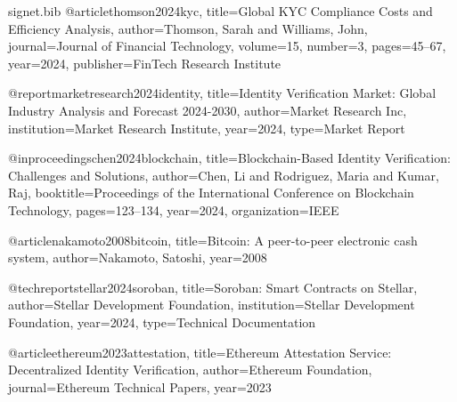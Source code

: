 \documentclass[11pt,a4paper]{article}
\begin{document}
\begin{filecontents}{signet.bib}
@article{thomson2024kyc,
  title={Global KYC Compliance Costs and Efficiency Analysis},
  author={Thomson, Sarah and Williams, John},
  journal={Journal of Financial Technology},
  volume={15},
  number={3},
  pages={45--67},
  year={2024},
  publisher={FinTech Research Institute}
}

@report{marketresearch2024identity,
  title={Identity Verification Market: Global Industry Analysis and Forecast 2024-2030},
  author={{Market Research Inc}},
  institution={Market Research Institute},
  year={2024},
  type={Market Report}
}

@inproceedings{chen2024blockchain,
  title={Blockchain-Based Identity Verification: Challenges and Solutions},
  author={Chen, Li and Rodriguez, Maria and Kumar, Raj},
  booktitle={Proceedings of the International Conference on Blockchain Technology},
  pages={123--134},
  year={2024},
  organization={IEEE}
}

@article{nakamoto2008bitcoin,
  title={Bitcoin: A peer-to-peer electronic cash system},
  author={Nakamoto, Satoshi},
  year={2008}
}

@techreport{stellar2024soroban,
  title={Soroban: Smart Contracts on Stellar},
  author={{Stellar Development Foundation}},
  institution={Stellar Development Foundation},
  year={2024},
  type={Technical Documentation}
}

@article{ethereum2023attestation,
  title={Ethereum Attestation Service: Decentralized Identity Verification},
  author={Ethereum Foundation},
  journal={Ethereum Technical Papers},
  year={2023}
}
\end{filecontents}
\end{document}
